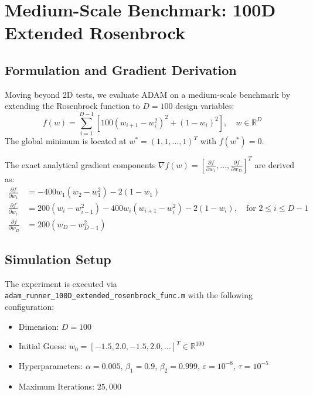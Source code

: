 \documentclass[11pt,a4paper]{article}
\begin{document}
\section{Medium-Scale Benchmark: 100D Extended Rosenbrock}\label{sec:bench100d}

\subsection{Formulation and Gradient Derivation}
Moving beyond 2D tests, we evaluate ADAM on a medium-scale benchmark by extending the Rosenbrock function to $D = 100$ design variables:
\begin{equation}
    f(w) = \sum_{i=1}^{D-1} \left[ 100 (w_{i+1} - w_i^2)^2 + (1 - w_i)^2 \right], \quad w \in \mathbb{R}^D
\end{equation}
The global minimum is located at $w^* = (1, 1, \dots, 1)^T$ with $f(w^*) = 0$.

\noindent The exact analytical gradient components $\nabla f(w) = [\frac{\partial f}{\partial w_1}, \dots, \frac{\partial f}{\partial w_D}]^T$ are derived as:
\begin{align}
    \frac{\partial f}{\partial w_1} &= -400 w_1 (w_2 - w_1^2) - 2(1 - w_1) \\
    \frac{\partial f}{\partial w_i} &= 200 (w_i - w_{i-1}^2) - 400 w_i (w_{i+1} - w_i^2) - 2(1 - w_i), \quad \text{for } 2 \le i \le D-1 \\
    \frac{\partial f}{\partial w_D} &= 200 (w_D - w_{D-1}^2)
\end{align}

\subsection{Simulation Setup}
The experiment is executed via \texttt{adam\_runner\_100D\_extended\_rosenbrock\_func.m} with the following configuration:
\begin{itemize}
    \item Dimension: $D = 100$
    \item Initial Guess: $w_0 = [-1.5, 2.0, -1.5, 2.0, \dots]^T \in \mathbb{R}^{100}$
    \item Hyperparameters: $\alpha = 0.005$, $\beta_1 = 0.9$, $\beta_2 = 0.999$, $\varepsilon = 10^{-8}$, $\tau = 10^{-5}$
    \item Maximum Iterations: $25{,}000$
\end{itemize}
\end{document}
